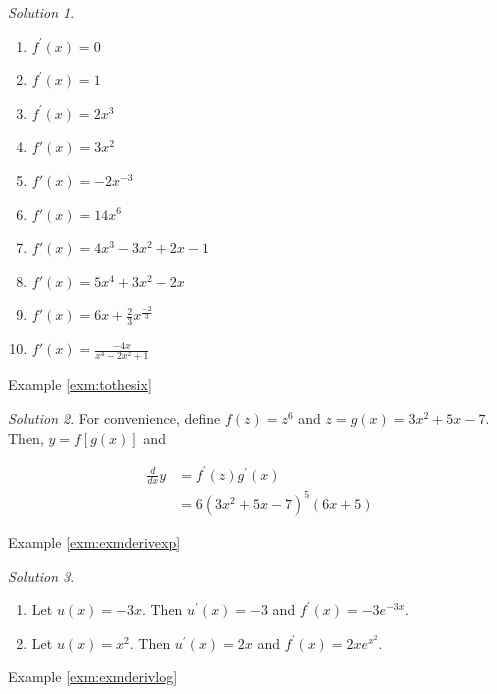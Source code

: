 \documentclass[
]{book}
\providecommand{\tightlist}{%
  \setlength{\itemsep}{0pt}\setlength{\parskip}{0pt}}
\theoremstyle{definition}
\theoremstyle{definition}
\theoremstyle{definition}
\theoremstyle{definition}
\theoremstyle{remark}
\newtheorem*{solution}{Solution}
\begin{document}
\begin{solution}
{}

\begin{enumerate}
\def\labelenumi{\arabic{enumi}.}
\tightlist
\item
  \(f^\prime(x)= 0\)
\item
  \(f^\prime(x)= 1\)
\item
  \(f^\prime(x)= 2x^3\)
\item
  \(f\prime(x)= 3x^2\)
\item
  \(f\prime(x)= -2x^{-3}\)
\item
  \(f\prime(x)= 14x^6\)
\item
  \(f\prime(x) = 4x^3 - 3x^2 + 2x -1\)
\item
  \(f\prime(x) = 5x^4 + 3x^2 - 2x\)
\item
  \(f\prime(x) = 6x + \frac{2}{3}x^{\frac{-2}{3}}\)
\item
  \(f\prime(x)= \frac{-4x}{x^4 - 2x^2 + 1}\)
\end{enumerate}
\end{solution}

Example \ref{exm:tothesix}

\begin{solution}
{}For convenience, define \(f(z) = z^6\) and \(z = g(x) = 3x^2+5x-7\). Then, \(y=f[g(x)]\) and

\begin{align*}
\frac{d}{dx}y&= f^\prime(z) g^\prime(x) \\
&= 6(3x^2+5x-7)^5 (6x + 5)
\end{align*}
\end{solution}

Example \ref{exm:exmderivexp}

\begin{solution}
{}

\begin{enumerate}
\def\labelenumi{\arabic{enumi}.}
\tightlist
\item
  Let \(u(x)=-3x\). Then \(u^\prime(x)=-3\) and \(f^\prime(x)=-3e^{-3x}\).
\item
  Let \(u(x)=x^2\). Then \(u^\prime(x)=2x\) and \(f^\prime(x)=2xe^{x^2}\).
\end{enumerate}
\end{solution}

Example \ref{exm:exmderivlog}
\end{document}
